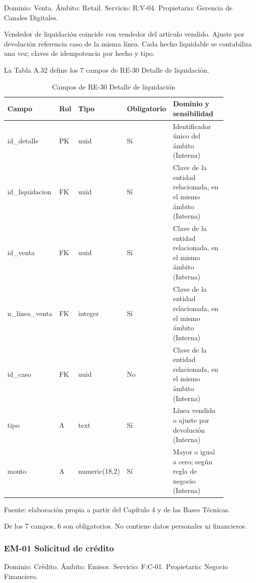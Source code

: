 \documentclass[11pt]{article}
\begin{document}
Dominio: Venta. Ámbito: Retail. Servicio: R:V-04. Propietario: Gerencia de Canales Digitales.

Vendedor de liquidación coincide con vendedor del artículo vendido. Ajuste por devolución referencia caso de la misma línea. Cada hecho liquidable se contabiliza una vez; claves de idempotencia por hecho y tipo.

La Tabla A.32 define los 7 campos de RE-30 Detalle de liquidación.

\clearpage

\begin{table}[htbp]
\caption{Campos de RE-30 Detalle de liquidación}\label{tab:d_re30}
\centering
\begin{tabular}{@{}p{0.167\linewidth}p{0.070\linewidth}p{0.079\linewidth}p{0.097\linewidth}p{0.465\linewidth}@{}}
\toprule Campo & Rol & Tipo & Obligatorio & Dominio y sensibilidad \\
\midrule
id\_detalle & PK & uuid & Sí & Identificador único del ámbito (Interna) \\
id\_liquidacion & FK & uuid & Sí & Clave de la entidad relacionada, en el mismo ámbito (Interna) \\
id\_venta & FK & uuid & Sí & Clave de la entidad relacionada, en el mismo ámbito (Interna) \\
n\_linea\_venta & FK & integer & Sí & Clave de la entidad relacionada, en el mismo ámbito (Interna) \\
id\_caso & FK & uuid & No & Clave de la entidad relacionada, en el mismo ámbito (Interna) \\
tipo & A & text & Sí & Línea vendida o ajuste por devolución (Interna) \\
monto & A & numeric(18,2) & Sí & Mayor o igual a cero; según regla de negocio (Interna) \\
\bottomrule
\end{tabular}
\par\smallskip
{\raggedright Fuente: elaboración propia a partir del Capítulo 4 y de las Bases Técnicas.\par}
\end{table}


De los 7 campos, 6 son obligatorios. No contiene datos personales ni financieros.

\subsubsection{EM-01 Solicitud de crédito}

Dominio: Crédito. Ámbito: Emisor. Servicio: F:C-01. Propietario: Negocio Financiero.
\end{document}
